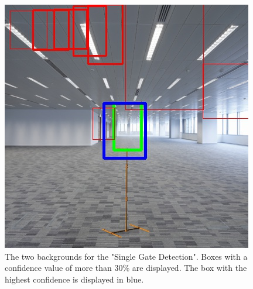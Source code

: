 \documentclass{article}
\begin{document}
\begin{figure}[h]
\begin{minipage}{0.25\textwidth}
	\end{minipage}
	\begin{minipage}{0.25\textwidth}
		\centering
		\includegraphics[width=\textwidth]{../fig/stream2}
	\end{minipage}
	\caption{The two backgrounds for the "Single Gate Detection". Boxes with a confidence value of more than 30\% are displayed. The box with the highest confidence is displayed in blue.}
	\label{fig:stream}
\end{figure}
\end{document}
